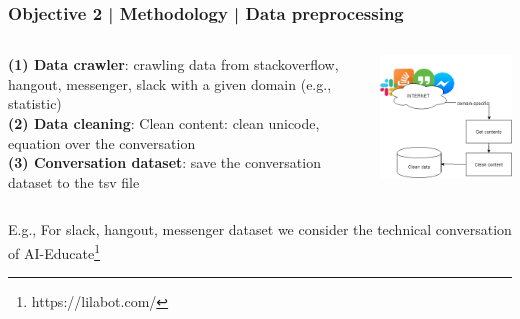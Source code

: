 \documentclass{beamer}
\begin{document}
\begin{frame}
\frametitle{Objective 2 | Methodology | Data preprocessing}



\begin{columns}
	
	\begin{column}{.55\textwidth}
\textbf{	(1) Data crawler}: crawling data from stackoverflow,\\ hangout, messenger, slack with a given domain (e.g., statistic)\\
\textbf{	(2) Data cleaning}: Clean content: clean unicode, equation over the conversation\\
\textbf{	(3) Conversation dataset}: save the conversation dataset to the tsv file\\
	\end{column}
	\begin{column}{.55\textwidth}
		\includegraphics[width=50mm]{dts.png}
	\end{column}
	

\end{columns}
\begin{flushleft}
{\small 	E.g., For slack, hangout, messenger dataset we consider the technical conversation of AI-Educate}\footnote{https://lilabot.com/}
\end{flushleft}

\end{frame}
\end{document}
